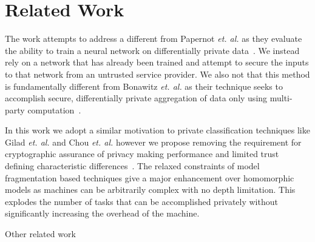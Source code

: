 \section{Related Work}

The work attempts to address a different from Papernot \textit{et. al.} as they evaluate the ability to
train a neural network on differentially private data~\cite{papernot2016semi}. We instead rely on a network
that has already been trained and attempt to secure the inputs to that network from an untrusted service
provider. We also not that this method is fundamentally different from Bonawitz \textit{et. al.} as their 
technique seeks to accomplish secure, differentially private aggregation of data only using multi-party
computation~\cite{bonawitz2017practical}.

In this work we adopt a similar motivation to private classification techniques like Gilad \textit{et. al.} and 
Chou \textit{et. al.} however we propose removing the requirement for cryptographic assurance of privacy 
making performance and limited trust defining characteristic
differences~\cite{gilad2016cryptonets,chou2018faster,chabanne2017privacy}. The relaxed constraints
of model fragmentation based techniques give a major enhancement over homomorphic models as machines 
can be arbitrarily complex with no depth limitation. This explodes the number of tasks that can be 
accomplished privately without significantly increasing the overhead of the machine. 


Other related work~\cite{yuan2014privacy,barni2006privacy,orlandi2007oblivious,chen2009privacy}

\FigFragmentMany